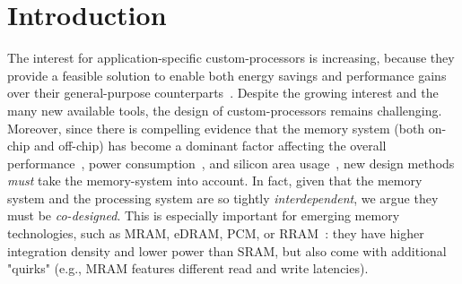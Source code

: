 \section{Introduction}
The interest for application-specific custom-processors is increasing, because they provide a feasible solution to enable both energy savings and performance gains over their general-purpose counterparts~\cite{hameed2010understanding}. %
Despite the growing interest and the many new available tools, the design of custom-processors remains challenging. Moreover, since there is compelling evidence that the memory system (both on-chip and off-chip) has become a dominant factor affecting the overall performance~\cite{williams2009roofline}, power consumption~\cite{dayarathna2015data}, and silicon area usage~\cite{oh2009analytical}, new design methods \textit{must} take the memory-system into account.
In fact, given that the memory system and the processing system are so tightly \textit{interdependent}, we argue they must be \textit{co-designed}. This is especially important for emerging memory technologies, such as MRAM, eDRAM, PCM, or RRAM~\cite{mem2016}: they have higher integration density and lower power than SRAM, but also come with additional "quirks" (e.g., MRAM features different read and write latencies).

%

